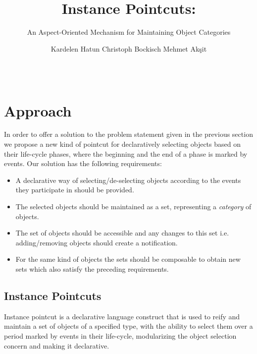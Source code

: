 \documentclass{acm_proc_article-sp}
\begin{document}
\title{Instance Pointcuts:}
\subtitle{An Aspect-Oriented Mechanism for Maintaining Object Categories}

\author{
\alignauthor
Kardelen Hatun \hspace{2cm} Christoph Bockisch \hspace{2cm} Mehmet Ak\c{s}it\\
\\
\\
}




\section{Approach}

In order to offer a solution to the problem statement given in the previous section we propose a new kind of pointcut for declaratively selecting objects based on their life-cycle phases, where the beginning and the end of a phase is marked by events. Our solution has the following requirements:

\begin{itemize}
\item A declarative way of selecting/de-selecting objects according to the events they participate in should be provided.
\item The selected objects should be maintained as a set, representing a \emph{category} of objects.
\item The set of objects should be accessible and any changes to this set i.e. adding/removing objects should create a notification.
\item For the same kind of objects the sets should be composable to obtain new sets which also satisfy the preceding requirements.
\end{itemize}

\subsection{Instance Pointcuts}
\label{sect:ip}
Instance pointcut is a declarative language construct that is used to reify and maintain a set of objects of a specified type, with the ability to select them over a period marked by events in their life-cycle, modularizing the object selection concern and making it declarative. 
 
\end{document}
